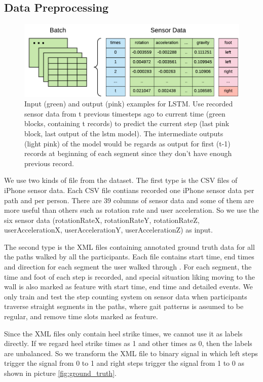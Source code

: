 \documentclass[11pt]{article}
\begin{document}
{\subsection{Data Preprocessing}

\begin{figure}[ht]
\centering
\includegraphics[scale=1]{input2}
\caption{Input (green) and output (pink) examples for LSTM. Use recorded sensor data from t previous timesteps ago to current time (green blocks, containing t records) to predict the current step (last pink block, last output of the lstm model). The intermediate outputs (light pink) of the model would be regards as output for first (t-1) records at beginning of each segment since they don't have enough previous record. }
\label{fig:batch_sensor_data}
\end{figure}

We use two kinds of file from the dataset. The first type is the CSV files of iPhone sensor data.  Each CSV file contians recorded one iPhone sensor data per path and per person. There are 39 columns of sensor data and some of them are more useful than others such as rotation rate and user acceleration. So we use the six sensor data (rotationRateX, rotationRateY, rotationRateZ,  userAccelerationX, userAccelerationY, userAccelerationZ) as input. 

The second type is the XML files containing annotated ground truth data for all the paths walked by all the participants. Each file contains start time, end times and direction for each segment the user walked through . For each segment, the time and foot of each step is recorded, and special situation liking moving to the wall is also marked as feature with start time, end time and detailed events. We only train and test the step counting system on sensor data when participants traverse straight segments in the paths, where gait patterns is assumed to be regular, and remove time slots marked as feature. 

Since the XML files only contain heel strike times, we cannot use it as labels directly. If we regard heel strike times as 1 and other times as 0, then the labels are unbalanced. So we transform the XML file to binary signal in which left steps trigger the signal from 0 to 1 and right steps trigger the signal from 1 to 0 as shown in picture \ref{fig:ground_truth}.

}
\end{document}
